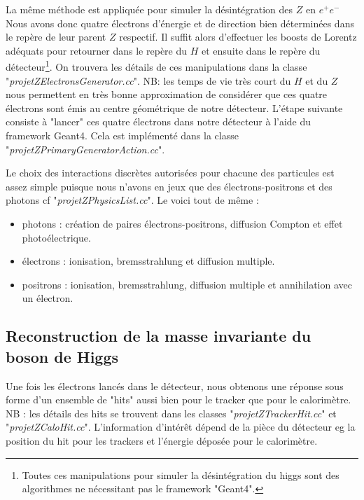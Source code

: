 \documentclass[11pt]{article}
\begin{document}
La même méthode est appliquée pour simuler la désintégration des $Z$ en
$e^+e^-$ Nous avons donc quatre électrons d'énergie et de direction bien
déterminées dans le repère de leur parent $Z$ respectif. Il suffit alors
d'effectuer les boosts de Lorentz adéquats pour retourner dans le repère du $H$
et ensuite dans le repère du détecteur\footnote{Toutes ces manipulations pour
simuler la désintégration du higgs sont des algorithmes ne nécessitant pas le
framework "Geant4".}. On trouvera les détails de ces manipulations dans la
classe "\textit{projetZElectronsGenerator.cc}". NB: les temps de vie très court
du $H$ et du $Z$ nous permettent en très bonne approximation de considérer que
ces quatre électrons sont émis au centre géométrique de notre détecteur. L'étape
suivante consiste à "lancer" ces quatre électrons dans notre détecteur à l'aide
du framework Geant4. Cela est implémenté dans la classe
"\textit{projetZPrimaryGeneratorAction.cc}".

Le choix des interactions discrètes autorisées pour chacune des particules est
assez simple puisque nous n'avons en jeux que des électrons-positrons et des
photons cf "\textit{projetZPhysicsList.cc}". Le voici tout de même : 
\begin{itemize}
\item photons : création de paires électrons-positrons, diffusion Compton et
effet photoélectrique.
\item électrons : ionisation, bremsstrahlung et diffusion multiple.
\item positrons : ionisation, bremsstrahlung, diffusion multiple et
annihilation avec un électron. 
\end{itemize}

\subsection{Reconstruction de la masse invariante du boson de Higgs}

Une fois les électrons lancés dans le détecteur, nous obtenons une réponse sous
forme d'un ensemble de "hits" aussi bien pour le tracker que pour le
calorimètre. NB : les détails des hits se trouvent dans les classes
"\textit{projetZTrackerHit.cc}" et "\textit{projetZCaloHit.cc}". L'information
d'intérêt dépend de la pièce du détecteur eg la position du hit pour les
trackers et l'énergie déposée pour le calorimètre. 
\end{document}
